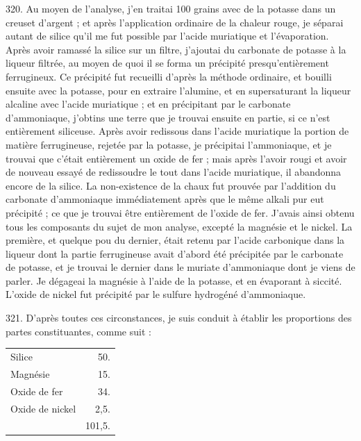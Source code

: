 \documentclass[a4paper, 11pt, oneside, polutonikogreek, french]{article}
\begin{document}
320. Au moyen de l'analyse, j'en traitai 100 grains avec de la potasse dans un creuset d'argent ; et après l'application ordinaire de la chaleur rouge, je séparai autant de silice qu'il me fut possible par l'acide muriatique et l'évaporation. Après avoir ramassé la silice sur un filtre, j'ajoutai du carbonate de potasse à la liqueur filtrée, au moyen de quoi il se forma un précipité presqu'entièrement ferrugineux. Ce précipité fut recueilli d'après la méthode ordinaire, et bouilli ensuite avec la potasse, pour en extraire l'alumine, et en supersaturant la liqueur alcaline avec l'acide muriatique ; et en précipitant par le carbonate d'ammoniaque, j'obtins une terre que je trouvai ensuite en partie, si ce n'est entièrement siliceuse. Après avoir redissous dans l'acide muriatique la portion de matière ferrugineuse, rejetée par la potasse, je précipitai l'ammoniaque, et je trouvai que c'était entièrement un oxide de fer ; mais après l'avoir rougi et avoir de nouveau essayé de redissoudre le tout dans l'acide muriatique, il abandonna encore de la silice. La non-existence de la chaux fut prouvée par l'addition du carbonate d'ammoniaque immédiatement après que le même alkali pur eut précipité ; ce que je trouvai être entièrement de l'oxide de fer. J'avais ainsi obtenu tous les composants du sujet de mon analyse, excepté la magnésie et le nickel. La première, et quelque pou du dernier, était retenu par l'acide carbonique dans la liqueur dont la partie ferrugineuse avait d'abord été précipitée par le carbonate de potasse, et je trouvai le dernier dans le muriate d'ammoniaque dont je viens de parler. Je dégageai la magnésie à l'aide de la potasse, et en évaporant à siccité. L'oxide de nickel fut précipité par le sulfure hydrogéné d'ammoniaque.

321. D'après toutes ces circonstances, je suis conduit à établir les proportions des partes constituantes, comme suit :

\begin{table}[!ht]
    \centering
    \bfseries
    \Fontauri
    \Large
    \begin{tabular}{l r}
        Silice & 50. \\
        Magnésie & 15. \\
        Oxide de fer & 34. \\
        Oxide de nickel & 2,5. \\ \hline
        ~ & 101,5. \\
    \end{tabular}
\end{table}
\end{document}
